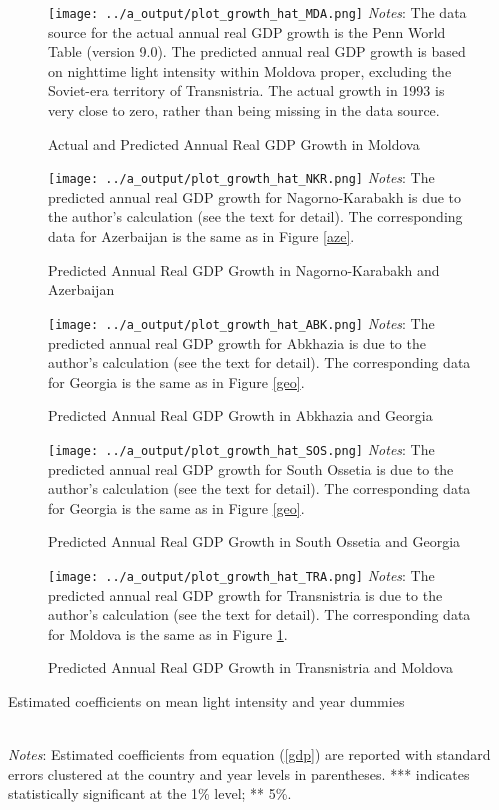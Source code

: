 \documentclass[12pt,a4paper]{article}%
\begin{document}
\begin{figure}[ptb]
\caption{Actual and Predicted Annual Real GDP Growth in Moldova}%
\label{mda}%
\texttt{[image: ../a\_output/plot\_growth\_hat\_MDA.png]}
{\scriptsize \textit{Notes}: 
	The data source for the actual annual real GDP growth is the Penn World Table (version 9.0). 
	The predicted annual real GDP growth is based on nighttime light intensity within Moldova proper, excluding the Soviet-era territory of Transnistria. 
	The actual growth in 1993 is very close to zero, rather than being missing in the data source.
}
\end{figure}

\begin{figure}[ptb]
\caption{Predicted Annual Real GDP Growth in Nagorno-Karabakh and Azerbaijan}%
\label{nkr}%
\texttt{[image: ../a\_output/plot\_growth\_hat\_NKR.png]}
{\scriptsize \textit{Notes}: 
	The predicted annual real GDP growth for Nagorno-Karabakh is due to the author's calculation (see the text for detail).
	The corresponding data for Azerbaijan is the same as in Figure \ref{aze}.
}
\end{figure}

\begin{figure}[ptb]
\caption{Predicted Annual Real GDP Growth in Abkhazia and Georgia}%
\label{abk}%
\texttt{[image: ../a\_output/plot\_growth\_hat\_ABK.png]}
{\scriptsize \textit{Notes}: 
	The predicted annual real GDP growth for Abkhazia is due to the author's calculation (see the text for detail).
	The corresponding data for Georgia is the same as in Figure \ref{geo}.
}
\end{figure}

\begin{figure}[ptb]
\caption{Predicted Annual Real GDP Growth in South Ossetia and Georgia}%
\label{sos}%
\texttt{[image: ../a\_output/plot\_growth\_hat\_SOS.png]}
{\scriptsize \textit{Notes}: 
	The predicted annual real GDP growth for South Ossetia is due to the author's calculation (see the text for detail).
	The corresponding data for Georgia is the same as in Figure \ref{geo}.
}
\end{figure}

\begin{figure}[ptb]
\caption{Predicted Annual Real GDP Growth in Transnistria and Moldova}%
\label{tra}%
\texttt{[image: ../a\_output/plot\_growth\_hat\_TRA.png]}
{\scriptsize \textit{Notes}: 
	The predicted annual real GDP growth for Transnistria is due to the author's calculation (see the text for detail).
	The corresponding data for Moldova is the same as in Figure \ref{mda}.
}
\end{figure}

\begin{table}[ptb]
\caption{Estimated coefficients on mean light intensity and year dummies}%
\label{estimates}%
\\
{\scriptsize \textit{Notes}: 
	Estimated coefficients from equation (\ref{gdp}) are reported with standard errors clustered at the country and year levels in parentheses. *** indicates statistically significant at the 1\% level; ** 5\%.
}
\end{table}
\end{document}

